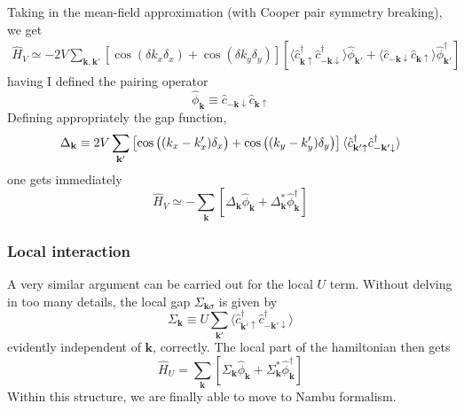 Taking in the mean-field approximation (with Cooper pair symmetry breaking), we get
\[
\begin{aligned}
	\hat H_V \simeq - 2V\sum_{\mathbf{k}, \mathbf{k}'}
	\left[
		\cos \left(
			\delta k_x \delta_x
		\right)	+ \cos \left(
			\delta k_y \delta_y
		\right)	
	\right] \left[
		\langle 
			\hat c_{\mathbf{k}\uparrow}^\dagger \hat c_{-\mathbf{k} \downarrow}^\dagger
		\rangle \hat \phi_{\mathbf{k}'} + \langle 
			\hat c_{-\mathbf{k}\downarrow} \hat c_{\mathbf{k} \uparrow}
		\rangle \hat \phi_{\mathbf{k}'}^\dagger
	\right]	
\end{aligned}
\]
having I defined the pairing operator 
\[
	\hat \phi_\mathbf{k} \equiv \hat c_{-\mathbf{k}\downarrow} \hat c_{\mathbf{k} \uparrow}
\]
Defining appropriately the gap function,
\begin{equation}\label{eq:gap-function-definition}
	\Delta_\mathbf{k} \equiv 2V \sum_{\mathbf{k}'} \left[
		\cos \left(
			\vphantom{A^A}
			(k_x-k_x') \delta_x
		\right)	+ \cos \left(
			\vphantom{A^A}
			(k_y-k_y') \delta_y
		\right)	
	\right] \langle 
		\hat c_{\mathbf{k}'\uparrow}^\dagger \hat c_{-\mathbf{k}' \downarrow}^\dagger
	\rangle
\end{equation}
one gets immediately
\begin{equation}\label{eq:extended-hubbard-nonlocal-interaction-mean-field-reciprocal}
	\hat H_V \simeq - \sum_\mathbf{k} \left[
		\Delta_\mathbf{k} \hat \phi_\mathbf{k} + \Delta_\mathbf{k}^* \hat \phi_\mathbf{k}^\dagger
	\right]	
\end{equation}
\todo

\subsubsection*{Local interaction}

A very similar argument can be carried out for the local $U$ term. Without delving in too many details, the local gap $\Sigma_{\mathbf{k}\sigma}$ is given by
\[
	\Sigma_\mathbf{k} \equiv U \sum_{\mathbf{k}'} \langle 
	\hat c_{\mathbf{k}'\uparrow}^\dagger \hat c_{-\mathbf{k}' \downarrow}^\dagger
	\rangle
\]
evidently independent of $\mathbf{k}$, correctly. The local part of the hamiltonian then gets
\begin{equation}\label{eq:extended-hubbard-local-interaction-mean-field-reciprocal}
	\hat H_U = \sum_\mathbf{k} \left[
		\Sigma_\mathbf{k} \hat \phi_\mathbf{k} + \Sigma_\mathbf{k}^* \hat \phi_\mathbf{k}^\dagger
	\right]	
\end{equation}
Within this structure, we are finally able to move to Nambu formalism.

